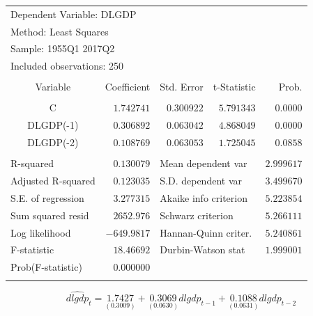 \documentclass[12pt]{report}
\begin{document}
\begin{table}[H]
	\centering
	\begin{tabular}{lrrrr}
		\multicolumn{3}{l}{Dependent Variable: DLGDP}&\multicolumn{1}{c}{}&\multicolumn{1}{c}{}\\
		\multicolumn{3}{l}{Method: Least Squares}&\multicolumn{1}{c}{}&\multicolumn{1}{c}{}\\
		\multicolumn{3}{l}{Sample: 1955Q1 2017Q2}&\multicolumn{1}{c}{}&\multicolumn{1}{c}{}\\
		\multicolumn{3}{l}{Included observations: 250}&\multicolumn{1}{c}{}&\multicolumn{1}{c}{}\\
		[4.5pt] \hline \\ [-4.5pt]
		\multicolumn{1}{c}{Variable}&\multicolumn{1}{r}{Coefficient}&\multicolumn{1}{r}{Std. Error}&\multicolumn{1}{r}{t-Statistic}&\multicolumn{1}{r}{Prob.}\\
		[4.5pt] \hline \\ [-4.5pt]
		\multicolumn{1}{c}{C}&\multicolumn{1}{r}{$1.742741$}&\multicolumn{1}{r}{$0.300922$}&\multicolumn{1}{r}{$5.791343$}&\multicolumn{1}{r}{$0.0000$}\\
		\multicolumn{1}{c}{DLGDP(-1)}&\multicolumn{1}{r}{$0.306892$}&\multicolumn{1}{r}{$0.063042$}&\multicolumn{1}{r}{$4.868049$}&\multicolumn{1}{r}{$0.0000$}\\
		\multicolumn{1}{c}{DLGDP(-2)}&\multicolumn{1}{r}{$0.108769$}&\multicolumn{1}{r}{$0.063053$}&\multicolumn{1}{r}{$1.725045$}&\multicolumn{1}{r}{$0.0858$}\\
		[4.5pt] \hline \\ [-4.5pt]
		\multicolumn{1}{l}{R-squared}&\multicolumn{1}{r}{$0.130079$}&\multicolumn{2}{l}{Mean dependent var}&\multicolumn{1}{r}{$2.999617$}\\
		\multicolumn{1}{l}{Adjusted R-squared}&\multicolumn{1}{r}{$0.123035$}&\multicolumn{2}{l}{S.D. dependent var}&\multicolumn{1}{r}{$3.499670$}\\
		\multicolumn{1}{l}{S.E. of regression}&\multicolumn{1}{r}{$3.277315$}&\multicolumn{2}{l}{Akaike info criterion}&\multicolumn{1}{r}{$5.223854$}\\
		\multicolumn{1}{l}{Sum squared resid}&\multicolumn{1}{r}{$2652.976$}&\multicolumn{2}{l}{Schwarz criterion}&\multicolumn{1}{r}{$5.266111$}\\
		\multicolumn{1}{l}{Log likelihood}&\multicolumn{1}{r}{$-649.9817$}&\multicolumn{2}{l}{Hannan-Quinn criter.}&\multicolumn{1}{r}{$5.240861$}\\
		\multicolumn{1}{l}{F-statistic}&\multicolumn{1}{r}{$18.46692$}&\multicolumn{2}{l}{Durbin-Watson stat}&\multicolumn{1}{r}{$1.999001$}\\
		\multicolumn{1}{l}{Prob(F-statistic)}&\multicolumn{1}{r}{$0.000000$}&\multicolumn{1}{c}{}&\multicolumn{1}{c}{}&\multicolumn{1}{c}{}\\
		[4.5pt] \hline \\ [-4.5pt]
	\end{tabular}
	$$\widehat{dlgdp}_t = \underset{(0.3009)}{1.7427} + \underset{(0.0630)}{0.3069}dlgdp_{t-1} + \underset{(0.0631)}{0.1088}dlgdp_{t-2}$$
\end{table}
\end{document}
